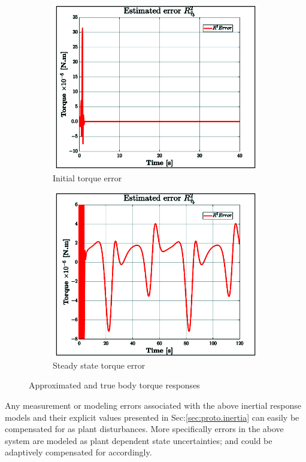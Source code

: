 \begin{figure}[hbtp]
\centering
\begin{subfigure}{0.49\textwidth}
\includegraphics[width=\textwidth]{graphs/tau-body-r-2}
\caption{Initial torque error}
\label{fig:tau-body-r-2}
\end{subfigure}
\begin{subfigure}{0.49\textwidth}
\centering
\includegraphics[width=\textwidth]{graphs/tau-body-r}
\caption{Steady state torque error}
\label{fig:tau-body-r-1}
\end{subfigure}
\caption{Approximated and true body torque responses}
\label{fig:tau-body-r}
\vspace{-14pt}
\end{figure}
\par
Any measurement or modeling errors associated with the above inertial response models and their explicit values presented in Sec:\ref{sec:proto.inertia} can easily be compensated for as plant disturbances. More specifically errors in the above system are modeled as plant dependent state uncertainties; and could be adaptively compensated for accordingly.
